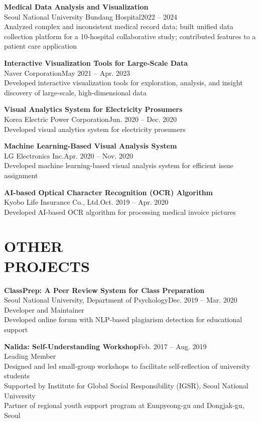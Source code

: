 \documentclass[margin]{res}
\begin{document}
\begin{resume}
\textbf{Medical Data Analysis and Visualization}\\
Seoul National University Bundang Hospital\hfill 2022 -- 2024\\
Analyzed complex and inconsistent medical record data; built unified data collection platform for a 10-hospital collaborative study; contributed features to a patient care application

\textbf{Interactive Visualization Tools for Large-Scale Data}\\
Naver Corporation\hfill May 2021 -- Apr. 2023\\
Developed interactive visualization tools for exploration, analysis, and insight discovery of large-scale, high-dimensional data

\textbf{Visual Analytics System for Electricity Prosumers}\\
Korea Electric Power Corporation\hfill Jun. 2020 -- Dec. 2020\\
Developed visual analytics system for electricity prosumers

\textbf{Machine Learning-Based Visual Analysis System}\\
LG Electronics Inc.\hfill Apr. 2020 -- Nov. 2020\\
Developed machine learning-based visual analysis system for efficient issue assignment

\textbf{AI-based Optical Character Recognition (OCR) Algorithm}\\
Kyobo Life Insurance Co., Ltd.\hfill Oct. 2019 -- Apr. 2020\\
Developed AI-based OCR algorithm for processing medical invoice pictures


\section{OTHER\\PROJECTS}

\textbf{ClassPrep: A Peer Review System for Class Preparation}\\
Seoul National University, Department of Psychology\hfill Dec. 2019 -- Mar. 2020\\
Developer and Maintainer\\
Developed online forum with NLP-based plagiarism detection for educational support

\textbf{Nalida: Self-Understanding Workshop}\hfill Feb. 2017 -- Aug. 2019\\
Leading Member\\
Designed and led small-group workshops to facilitate self-reflection of university students\\
Supported by Institute for Global Social Responsibility (IGSR), Seoul National University\\
Partner of regional youth support program at Eunpyeong-gu and Dongjak-gu, Seoul



\end{resume}
\end{document}
